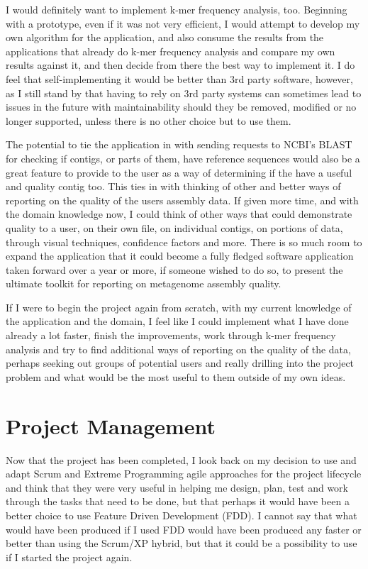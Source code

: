I would definitely want to implement k-mer frequency analysis, too. Beginning with a prototype, even if it was not very efficient, I would attempt to develop my own algorithm for the application, and also consume the results from the applications that already do k-mer frequency analysis and compare my own results against it, and then decide from there the best way to implement it. I do feel that self-implementing it would be better than 3rd party software, however, as I still stand by that having to rely on 3rd party systems can sometimes lead to issues in the future with maintainability should they be removed, modified or no longer supported, unless there is no other choice but to use them.

The potential to tie the application in with sending requests to NCBI's BLAST for checking if contigs, or parts of them, have reference sequences would also be a great feature to provide to the user as a way of determining if the have a useful and quality contig too. This ties in with thinking of other and better ways of reporting on the quality of the users assembly data. If given more time, and with the domain knowledge now, I could think of other ways that could demonstrate quality to a user, on their own file, on individual contigs, on portions of data, through visual techniques, confidence factors and more. There is so much room to expand the application that it could become a fully fledged software application taken forward over a year or more, if someone wished to do so, to present the ultimate toolkit for reporting on metagenome assembly quality.

If I were to begin the project again from scratch, with my current knowledge of the application and the domain, I feel like I could implement what I have done already a lot faster, finish the improvements, work through k-mer frequency analysis and try to find additional ways of reporting on the quality of the data, perhaps seeking out groups of potential users and really drilling into the project problem and what would be the most useful to them outside of my own ideas.

\section{Project Management}
Now that the project has been completed, I look back on my decision to use and adapt Scrum and Extreme Programming agile approaches for the project lifecycle and think that they were very useful in helping me design, plan, test and work through the tasks that need to be done, but that perhaps it would have been a better choice to use Feature Driven Development (FDD). I cannot say that what would have been produced if I used FDD would have been produced any faster or better than using the Scrum/XP hybrid, but that it could be a possibility to use if I started the project again.


